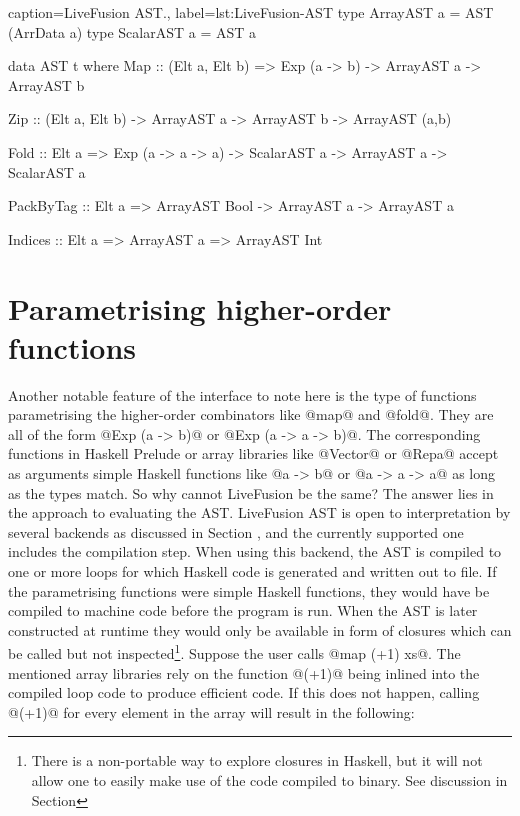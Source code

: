\documentclass[preamble.tex]{subfiles}
\begin{document}
\begin{hscode2}{%
    caption={LiveFusion AST.},%
    label=lst:LiveFusion-AST}
type ArrayAST a = AST (ArrData a)
type ScalarAST a = AST a

data AST t where
  Map      :: (Elt a, Elt b)
           => Exp (a -> b)
           -> ArrayAST a
           -> ArrayAST b

  Zip      :: (Elt a, Elt b)
           -> ArrayAST a
           -> ArrayAST b
           -> ArrayAST (a,b)

  Fold     :: Elt a
           => Exp (a -> a -> a)
           -> ScalarAST a
           -> ArrayAST a
           -> ScalarAST a

  PackByTag :: Elt a
            => ArrayAST Bool
            -> ArrayAST a
            -> ArrayAST a

  Indices   :: Elt a
            => ArrayAST a
            => ArrayAST Int
\end{hscode2}



\section{Parametrising higher-order functions}

Another notable feature of the interface to note here is the type of functions parametrising the higher-order combinators like @map@ and @fold@. They are all of the form @Exp (a -> b)@ or @Exp (a -> a -> b)@. The corresponding functions in Haskell Prelude or array libraries like @Vector@ or @Repa@ accept as arguments simple Haskell functions like @a -> b@ or @a -> a -> a@ as long as the types match. So why cannot LiveFusion be the same? The answer lies in the approach to evaluating the AST. LiveFusion AST is open to interpretation by several backends as discussed in Section , and the currently supported one includes the compilation step. When using this backend, the AST is compiled to one or more loops for which Haskell code is generated and written out to file. If the parametrising functions were simple Haskell functions, they would have be compiled to machine code before the program is run. When the AST is later constructed at runtime they would only be available in form of closures which can be called but not inspected\footnote{There is a non-portable way to explore closures in Haskell, but it will not allow one to easily make use of the code compiled to binary. See discussion in Section }. Suppose the user calls @map (+1) xs@. The mentioned array libraries rely on the function @(+1)@ being inlined into the compiled loop code to produce efficient code. If this does not happen, calling @(+1)@ for every element in the array will result in the following:
\end{document}
